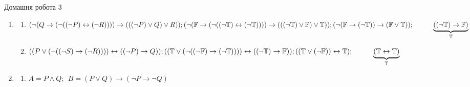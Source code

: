 \documentclass[a4paper,12pt]{article}
\newcommand\tab[1][1cm]{\hspace*{#1}}
\begin{document}
\begin{center}
{\LARGE Домашня робота 3}	
\end{center}
\begin{enumerate}
	\item \begin{enumerate} 
	\item $(\neg(Q\rightarrow(\neg ((\neg P)\leftrightarrow(\neg R))))\rightarrow(((\neg P)\lor Q)\lor R));\\(\neg(\mathbb{F}\rightarrow(\neg ((\neg \mathbb{T})\leftrightarrow(\neg \mathbb{T}))))\rightarrow(((\neg \mathbb{T})\lor \mathbb{F})\lor \mathbb{T}));\\(\neg(\mathbb{F}\rightarrow(\neg \mathbb{T}))\rightarrow( \mathbb{F}\lor \mathbb{T}));\tab \underbrace{((\neg \mathbb{T})\rightarrow\mathbb{F})}_{\mathbb{T}}$
	\item $((P\lor(\neg((\neg S)\rightarrow(\neg R))))\leftrightarrow((\neg P)\rightarrow Q));\\((\mathbb{T}\lor(\neg((\neg \mathbb{F})\rightarrow(\neg \mathbb{T}))))\leftrightarrow((\neg \mathbb{T})\rightarrow \mathbb{F}));\\((\mathbb{T}\lor(\neg \mathbb{F}))\leftrightarrow \mathbb{T});\tab \underbrace{(\mathbb{T}\leftrightarrow\mathbb{T})}_{\mathbb{T}}$
	\end{enumerate}
	\item \begin{enumerate} \item $A=P\land Q;\>\>B=(P\lor Q)	\rightarrow(\neg P\rightarrow\neg Q)$
\begin{table}[!htb]


\end{table}
\end{enumerate}
\end{enumerate}
\end{document}
